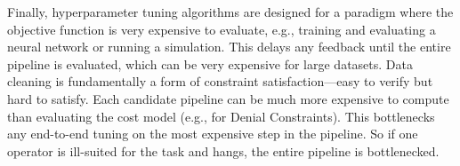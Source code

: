  Finally, hyperparameter tuning algorithms are designed for a paradigm where the objective function is very expensive to evaluate, e.g., training and evaluating a neural network or running a simulation. This delays any feedback until the entire pipeline is evaluated, which can be very expensive for large datasets. Data cleaning is fundamentally a form of constraint satisfaction---easy to verify but hard to satisfy.
Each candidate pipeline can be much more expensive to compute than evaluating the cost model (e.g., for Denial Constraints).  This bottlenecks any end-to-end tuning on the most expensive step in the pipeline.
So if one operator is ill-suited for the task and hangs, the entire pipeline is bottlenecked.







